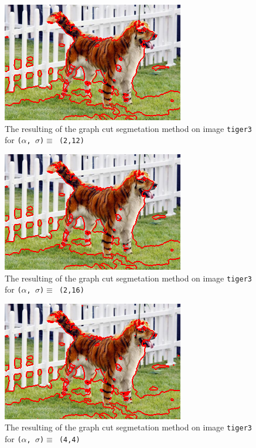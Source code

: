 {  \begin{minipage}{0.45\linewidth}
    \begin{figure}[H]
      \includegraphics[scale=0.5]{./images/04/Q11/var_a_b/tiger3/graphcut2_a2_s12.png}
      \caption{The resulting of the graph cut segmetation method on image \texttt{tiger3} for
        \texttt{($\alpha$, $\sigma$)$ \equiv$ (2,12)}}
      \label{fig:04_tiger32_a2_s12}
    \end{figure}
    \vfill
    \begin{figure}[H]
      \includegraphics[scale=0.5]{./images/04/Q11/var_a_b/tiger3/graphcut2_a2_s16.png}
      \caption{The resulting of the graph cut segmetation method on image \texttt{tiger3} for
        \texttt{($\alpha$, $\sigma$)$ \equiv$ (2,16)}}
      \label{fig:04_tiger32_a2_s16}
    \end{figure}
    \vfill
    \begin{figure}[H]
      \includegraphics[scale=0.5]{./images/04/Q11/var_a_b/tiger3/graphcut2_a4_s4.png}
      \caption{The resulting of the graph cut segmetation method on image \texttt{tiger3} for
        \texttt{($\alpha$, $\sigma$)$ \equiv$ (4,4)}}
      \label{fig:04_tiger32_a4_s4}
    \end{figure}
  \end{minipage}
}


